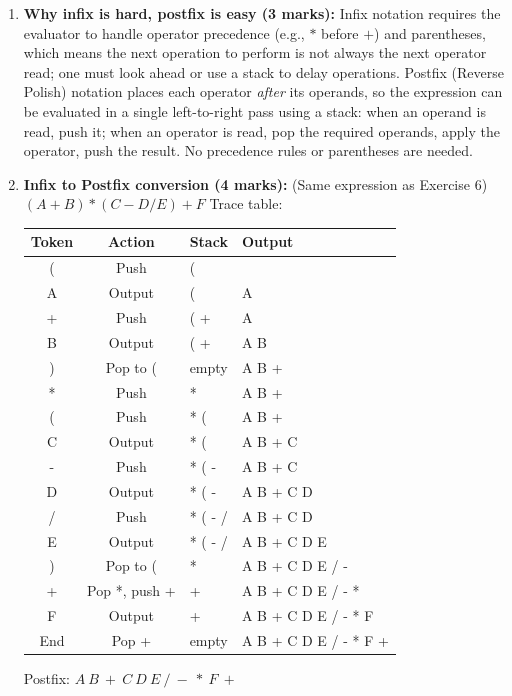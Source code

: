 \documentclass[11pt]{article}
\begin{document}
\begin{corrige}
\begin{enumerate}
\item \textbf{Why infix is hard, postfix is easy (3 marks):} Infix notation requires the evaluator to handle operator precedence (e.g., $*$ before $+$) and parentheses, which means the next operation to perform is not always the next operator read; one must look ahead or use a stack to delay operations. Postfix (Reverse Polish) notation places each operator \emph{after} its operands, so the expression can be evaluated in a single left-to-right pass using a stack: when an operand is read, push it; when an operator is read, pop the required operands, apply the operator, push the result. No precedence rules or parentheses are needed.

\item \textbf{Infix to Postfix conversion (4 marks):} (Same expression as Exercise 6)
$(A + B) * (C - D / E) + F$
Trace table:
\begin{center}
\begin{tabularx}{\linewidth}{|c|c|X|X|}\hline
\rowcolor{popblueL}
\textbf{Token} & \textbf{Action} & \textbf{Stack} & \textbf{Output} \\ \hline
( & Push & ( &  \\ \hline
A & Output & ( & A \\ \hline
+ & Push & ( + & A \\ \hline
B & Output & ( + & A B \\ \hline
) & Pop to ( & empty & A B + \\ \hline
* & Push & * & A B + \\ \hline
( & Push & * ( & A B + \\ \hline
C & Output & * ( & A B + C \\ \hline
- & Push & * ( - & A B + C \\ \hline
D & Output & * ( - & A B + C D \\ \hline
/ & Push & * ( - / & A B + C D \\ \hline
E & Output & * ( - / & A B + C D E \\ \hline
) & Pop to ( & * & A B + C D E / - \\ \hline
+ & Pop *, push + & + & A B + C D E / - * \\ \hline
F & Output & + & A B + C D E / - * F \\ \hline
End & Pop + & empty & A B + C D E / - * F + \\ \hline
\end{tabularx}
\end{center}
Postfix: $A\ B\ +\ C\ D\ E\ /\ -\ *\ F\ +$


\end{enumerate}
\end{corrige}
\end{document}
